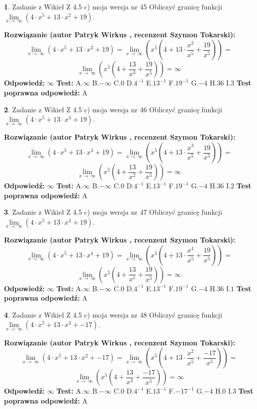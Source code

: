 \documentclass[12pt, a4paper]{article}
\theoremstyle{definition} %
\newtheorem{zad}{}
\newcommand{\zadStart}[1]{\begin{zad}#1\newline}
\newcommand{\zadStop}{\end{zad}}
\newcommand{\rozwStart}[2]{\noindent \textbf{Rozwiązanie (autor #1 , recenzent #2): }\newline}
\newcommand{\rozwStop}{\newline}
\newcommand{\odpStart}{\noindent \textbf{Odpowiedź:}\newline}
\newcommand{\odpStop}{\newline}
\newcommand{\testStart}{\noindent \textbf{Test:}\newline}
\newcommand{\testStop}{\newline}
\newcommand{\kluczStart}{\noindent \textbf{Test poprawna odpowiedź:}\newline}
\newcommand{\kluczStop}{\newline}
\begin{document}
\zadStart{Zadanie z Wikieł Z 4.5 c) moja wersja nr 45}
Obliczyć granicę funkcji  $\lim\limits_{x\to\ \infty}(4 \cdot x^{5}+13 \cdot x^{2}+19)$.
\zadStop
\rozwStart{Patryk Wirkus}{Szymon Tokarski}
$$\lim\limits_{x\to\ \infty}(4 \cdot x^{5}+13 \cdot x^{2}+19) = \lim\limits_{x\to\ \infty}(x^{5}(4 +13 \cdot \frac{x^{2}}{x^{5}}+\frac{19}{x^{5}})) =$$ $$\lim\limits_{x\to\ \infty}(x^{5}(4 +\frac{13}{x^{3}}+\frac{19}{x^{5}})) =\infty$$
\rozwStop
\odpStart
$\infty$
\odpStop
\testStart
A.$\infty$ B.$-\infty$ C.$0$ D.$4^{-1}$ E.$13^{-1}$
F.$19^{-1}$ G.$-4$
H.$36$
I.$3$
\testStop
\kluczStart
A
\kluczStop



\zadStart{Zadanie z Wikieł Z 4.5 c) moja wersja nr 46}
Obliczyć granicę funkcji  $\lim\limits_{x\to\ \infty}(4 \cdot x^{5}+13 \cdot x^{3}+19)$.
\zadStop
\rozwStart{Patryk Wirkus}{Szymon Tokarski}
$$\lim\limits_{x\to\ \infty}(4 \cdot x^{5}+13 \cdot x^{3}+19) = \lim\limits_{x\to\ \infty}(x^{5}(4 +13 \cdot \frac{x^{3}}{x^{5}}+\frac{19}{x^{5}})) =$$ $$\lim\limits_{x\to\ \infty}(x^{5}(4 +\frac{13}{x^{2}}+\frac{19}{x^{5}})) =\infty$$
\rozwStop
\odpStart
$\infty$
\odpStop
\testStart
A.$\infty$ B.$-\infty$ C.$0$ D.$4^{-1}$ E.$13^{-1}$
F.$19^{-1}$ G.$-4$
H.$36$
I.$2$
\testStop
\kluczStart
A
\kluczStop



\zadStart{Zadanie z Wikieł Z 4.5 c) moja wersja nr 47}
Obliczyć granicę funkcji  $\lim\limits_{x\to\ \infty}(4 \cdot x^{5}+13 \cdot x^{4}+19)$.
\zadStop
\rozwStart{Patryk Wirkus}{Szymon Tokarski}
$$\lim\limits_{x\to\ \infty}(4 \cdot x^{5}+13 \cdot x^{4}+19) = \lim\limits_{x\to\ \infty}(x^{5}(4 +13 \cdot \frac{x^{4}}{x^{5}}+\frac{19}{x^{5}})) =$$ $$\lim\limits_{x\to\ \infty}(x^{5}(4 +\frac{13}{x^{1}}+\frac{19}{x^{5}})) =\infty$$
\rozwStop
\odpStart
$\infty$
\odpStop
\testStart
A.$\infty$ B.$-\infty$ C.$0$ D.$4^{-1}$ E.$13^{-1}$
F.$19^{-1}$ G.$-4$
H.$36$
I.$1$
\testStop
\kluczStart
A
\kluczStop



\zadStart{Zadanie z Wikieł Z 4.5 c) moja wersja nr 48}
Obliczyć granicę funkcji  $\lim\limits_{x\to\ \infty}(4 \cdot x^{5}+13 \cdot x^{2}+-17)$.
\zadStop
\rozwStart{Patryk Wirkus}{Szymon Tokarski}
$$\lim\limits_{x\to\ \infty}(4 \cdot x^{5}+13 \cdot x^{2}+-17) = \lim\limits_{x\to\ \infty}(x^{5}(4 +13 \cdot \frac{x^{2}}{x^{5}}+\frac{-17}{x^{5}})) =$$ $$\lim\limits_{x\to\ \infty}(x^{5}(4 +\frac{13}{x^{3}}+\frac{-17}{x^{5}})) =\infty$$
\rozwStop
\odpStart
$\infty$
\odpStop
\testStart
A.$\infty$ B.$-\infty$ C.$0$ D.$4^{-1}$ E.$13^{-1}$
F.$-17^{-1}$ G.$-4$
H.$0$
I.$3$
\testStop
\kluczStart
A
\kluczStop
\end{document}

